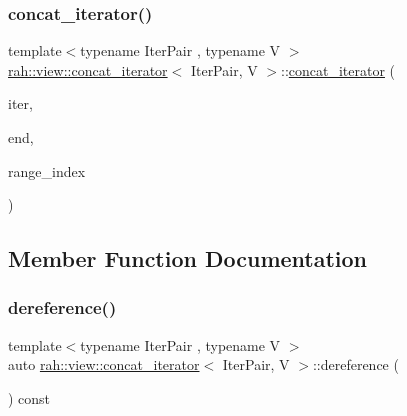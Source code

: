 \mbox{\label{structrah_1_1view_1_1concat__iterator_a45e7ea9b72e7df5390a2ae09a6923d11}} 
\subsubsection{\texorpdfstring{concat\_iterator()}{concat\_iterator()}\hspace{0.1cm}{\footnotesize\ttfamily [2/2]}}
{\footnotesize\ttfamily template$<$typename Iter\+Pair , typename V $>$ \\
\mbox{\hyperlink{structrah_1_1view_1_1concat__iterator}{rah\+::view\+::concat\+\_\+iterator}}$<$ Iter\+Pair, V $>$\+::\mbox{\hyperlink{structrah_1_1view_1_1concat__iterator}{concat\+\_\+iterator}} (\begin{DoxyParamCaption}\item[{Iter\+Pair const \&}]{iter,  }\item[{Iter\+Pair const \&}]{end,  }\item[{size\+\_\+t}]{range\+\_\+index }\end{DoxyParamCaption})\hspace{0.3cm}{\ttfamily [inline]}}



\subsection{Member Function Documentation}
\mbox{\label{structrah_1_1view_1_1concat__iterator_af36beb1e5fbf0614bf42483c582a0e64}} 
\subsubsection{\texorpdfstring{dereference()}{dereference()}\hspace{0.1cm}{\footnotesize\ttfamily [1/2]}}
{\footnotesize\ttfamily template$<$typename Iter\+Pair , typename V $>$ \\
auto \mbox{\hyperlink{structrah_1_1view_1_1concat__iterator}{rah\+::view\+::concat\+\_\+iterator}}$<$ Iter\+Pair, V $>$\+::dereference (\begin{DoxyParamCaption}{ }\end{DoxyParamCaption}) const\hspace{0.3cm}{\ttfamily [inline]}}


